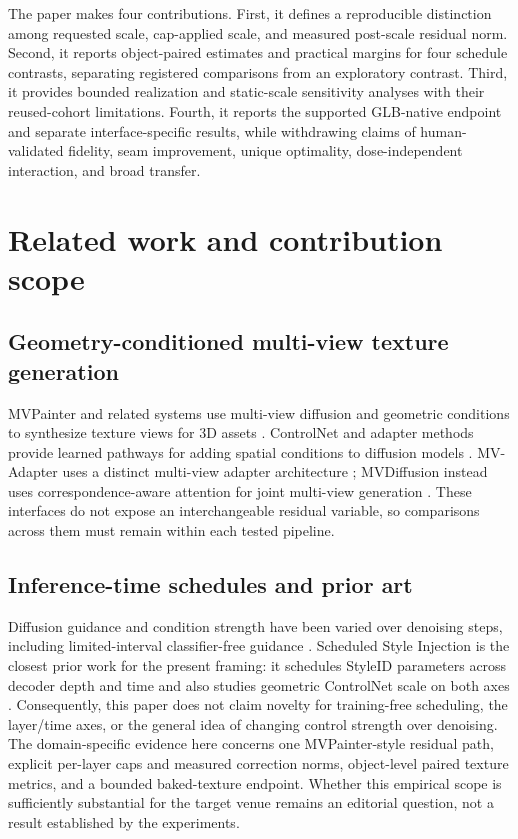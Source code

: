 \documentclass[times,twocolumn,final]{elsarticle}
\begin{document}
The paper makes four contributions. First, it defines a reproducible distinction among requested scale, cap-applied scale, and measured post-scale residual norm. Second, it reports object-paired estimates and practical margins for four schedule contrasts, separating registered comparisons from an exploratory contrast. Third, it provides bounded realization and static-scale sensitivity analyses with their reused-cohort limitations. Fourth, it reports the supported GLB-native endpoint and separate interface-specific results, while withdrawing claims of human-validated fidelity, seam improvement, unique optimality, dose-independent interaction, and broad transfer.

\section{Related work and contribution scope}
\label{sec:related}

\subsection{Geometry-conditioned multi-view texture generation}

MVPainter and related systems use multi-view diffusion and geometric conditions to synthesize texture views for 3D assets \cite{shao2025mvpainter}. ControlNet and adapter methods provide learned pathways for adding spatial conditions to diffusion models \cite{zhang2023controlnet}. MV-Adapter uses a distinct multi-view adapter architecture \cite{huang2025mvadapter}; MVDiffusion instead uses correspondence-aware attention for joint multi-view generation \cite{tang2023mvdiffusion}. These interfaces do not expose an interchangeable residual variable, so comparisons across them must remain within each tested pipeline.

\subsection{Inference-time schedules and prior art}

Diffusion guidance and condition strength have been varied over denoising steps, including limited-interval classifier-free guidance \cite{kynkaanniemi2024limited}. Scheduled Style Injection is the closest prior work for the present framing: it schedules StyleID parameters across decoder depth and time and also studies geometric ControlNet scale on both axes \cite{kulkarni2026scheduled}. Consequently, this paper does not claim novelty for training-free scheduling, the layer/time axes, or the general idea of changing control strength over denoising. The domain-specific evidence here concerns one MVPainter-style residual path, explicit per-layer caps and measured correction norms, object-level paired texture metrics, and a bounded baked-texture endpoint. Whether this empirical scope is sufficiently substantial for the target venue remains an editorial question, not a result established by the experiments.
\end{document}
